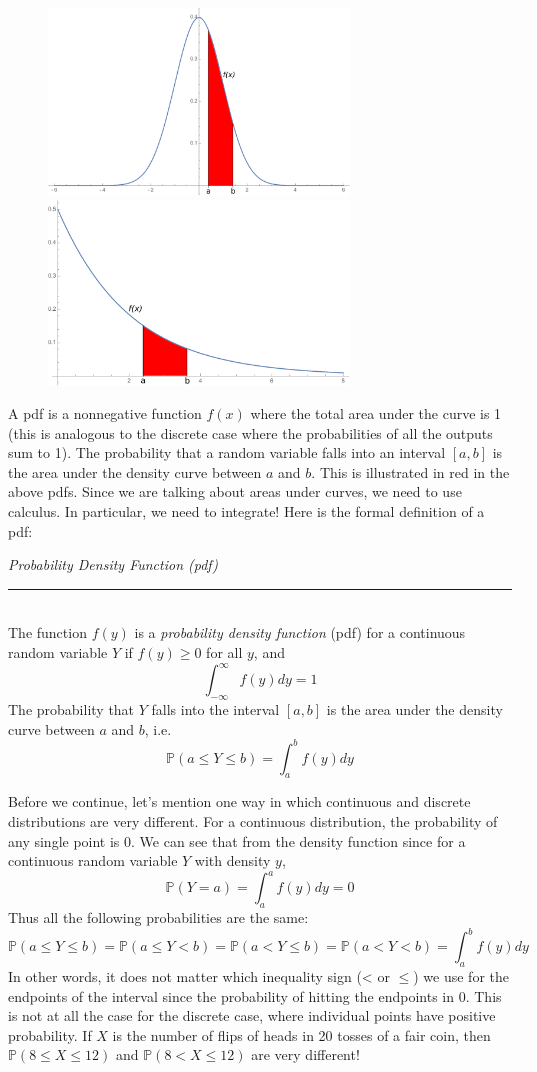 \documentclass[12pt]{article}
\theoremstyle{definition}
\theoremstyle{remark}
\def\P{{\mathbb P}}
\begin{document}
\begin{figure}[H]
\centering
\includegraphics[width=8cm]{normalpdf}
\includegraphics[width=8cm]{exppdf}
\end{figure}

A pdf is a nonnegative function $f(x)$ where the total area under the curve is 1 (this is analogous to the discrete case where the probabilities of all the outputs sum to 1). The probability that a random variable falls into an interval $[a, b]$ is the area under the density curve between $a$ and $b$. This is illustrated in red in the above pdfs. Since we are talking about areas under curves, we need to use calculus. In particular, we need to integrate! Here is the formal definition of a pdf:

\begin{framed}
\emph{Probability Density Function (pdf)}\\
  \rule{\dimexpr{}\fboxrule}{.1pt} \\
The function $f(y)$ is a \emph{probability density function} (pdf) for a continuous random variable $Y$ if $f(y) \geq 0$ for all $y$, and
\[
\int_{-\infty}^\infty f(y) dy = 1
\]
The probability that $Y$ falls into the interval $[a, b]$ is the area under the density curve between $a$ and $b$, i.e.
\[
\P(a \leq Y \leq b) = \int_a^b f(y) dy
\]
\end{framed}

Before we continue, let's mention one way in which continuous and discrete distributions are very different. For a continuous distribution, the probability of any single point is 0. We can see that from the density function since for a continuous random variable $Y$ with density $y$,
\[
\P(Y = a) = \int_a^a f(y) dy = 0
\]
Thus all the following probabilities are the same:
\[
\P(a \leq Y \leq b) = \P(a \leq Y < b) = \P(a < Y \leq b) = \P(a < Y < b) = \int_a^b f(y) dy
\]
In other words, it does not matter which inequality sign (< or $\leq$) we use for the endpoints of the interval since the probability of hitting the endpoints in 0. This is not at all the case for the discrete case, where individual points have positive probability. If $X$ is the number of flips of heads in 20 tosses of a fair coin, then $\P(8 \leq X \leq 12)$ and $\P(8 < X \leq 12)$ are very different!
\end{document}
